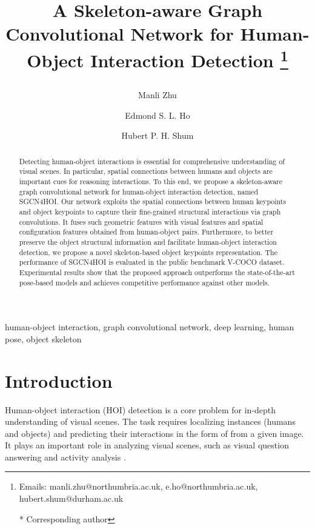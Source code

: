 \documentclass[a4paper, 10pt, conference]{IEEEtran}
\begin{document}
\title{A Skeleton-aware Graph Convolutional Network for Human-Object Interaction Detection 
\thanks{Emails: manli.zhu@northumbria.ac.uk, e.ho@northumbria.ac.uk, hubert.shum@durham.ac.uk

* Corresponding author
}

}

\author[1]{Manli Zhu}
\author[1]{Edmond S. L. Ho}
\author[2*]{Hubert P. H. Shum}


\maketitle


\begin{abstract}
Detecting human-object interactions is essential for comprehensive understanding of visual scenes. In particular, spatial connections between humans and objects are important cues for reasoning interactions. To this end, we propose a skeleton-aware graph convolutional network for human-object interaction detection, named SGCN4HOI. Our network exploits the spatial connections between human keypoints and object keypoints to capture their fine-grained structural interactions via graph convolutions. It fuses such geometric features with visual features and spatial configuration features obtained from human-object pairs. Furthermore, to better preserve the object structural information and facilitate human-object interaction detection, we propose a novel skeleton-based object keypoints representation. The performance of SGCN4HOI is evaluated in the public benchmark V-COCO dataset. Experimental results show that the proposed approach outperforms the state-of-the-art pose-based models and achieves competitive performance against other models.
\end{abstract}

\begin{IEEEkeywords}
human-object interaction, graph convolutional network, deep learning, human pose, object skeleton
\end{IEEEkeywords}


\section{Introduction}
Human-object interaction (HOI) detection is a core problem for in-depth understanding of visual scenes. The task requires localizing instances (humans and objects) and predicting their interactions in the form of  from a given image. It plays an important role in analyzing visual scenes, such as visual question answering \cite{VQA} and activity analysis \cite{ActivityNet}. 
\end{document}
